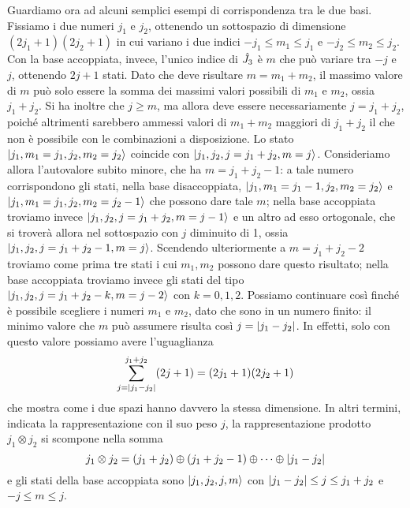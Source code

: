 Guardiamo ora ad alcuni semplici esempi di corrispondenza tra le due basi.
Fissiamo i due numeri $j_1$ e $j_2$, ottenendo un sottospazio di dimensione $(2j_1+1)(2j_2+1)$ in cui variano i due indici $-j_1\le m_1\le j_1$ e $-j_2\le m_2\le j_2$.
Con la base accoppiata, invece, l'unico indice di $\hat{J}_3$ è $m$ che può variare tra $-j$ e $j$, ottenendo $2j+1$ stati.
Dato che deve risultare $m=m_1+m_2$, il massimo valore di $m$ può solo essere la somma dei massimi valori possibili di $m_1$ e $m_2$, ossia $j_1+j_2$.
Si ha inoltre che $j\ge m$, ma allora deve essere necessariamente $j=j_1+j_2$, poich\'e altrimenti sarebbero ammessi valori di $m_1+m_2$ maggiori di $j_1+j_2$ il che non è possibile con le combinazioni a disposizione.
Lo stato $\lvert j_1,m_1=j_1,j_2,m_2=j_2\rangle$ coincide con $\lvert j_1,j_2,j=j_1+j_2,m=j\rangle$.
Consideriamo allora l'autovalore subito minore, che ha $m=j_1+j_2-1$: a tale numero corrispondono gli stati, nella base disaccoppiata, $\lvert j_1,m_1=j_1-1,j_2,m_2=j_2\rangle$ e $\lvert j_1,m_1=j_1,j_2,m_2=j_2-1\rangle$ che possono dare tale $m$; nella base accoppiata troviamo invece $\lvert j_1,j_2,j=j_1+j_2,m=j-1\rangle$ e un altro ad esso ortogonale, che si troverà allora nel sottospazio con $j$ diminuito di 1, ossia $\lvert j_1,j_2,j=j_1+j_2-1,m=j\rangle$.
Scendendo ulteriormente a $m=j_1+j_2-2$ troviamo come prima tre stati i cui $m_1,m_2$ possono dare questo risultato; nella base accoppiata troviamo invece gli stati del tipo $\lvert j_1,j_2,j=j_1+j_2-k,m=j-2\rangle$ con $k=0,1,2$.
Possiamo continuare cos\`i finch\'e è possibile scegliere i numeri $m_1$ e $m_2$, dato che sono in un numero finito: il minimo valore che $m$ può assumere risulta cos\`i $j=\lvert j_1-j_2\rvert$.
In effetti, solo con questo valore possiamo avere l'uguaglianza
\begin{equation}
	\sum_{j=\lvert j_1-j_2\rvert}^{j_1+j_2}(2j+1)=(2j_1+1)(2j_2+1)
\end{equation}
che mostra come i due spazi hanno davvero la stessa dimensione.
In altri termini, indicata la rappresentazione con il suo peso $j$, la rappresentazione prodotto $j_1\otimes j_2$ si scompone nella somma
\begin{equation}
	j_1\otimes j_2=(j_1+j_2)\oplus(j_1+j_2-1)\oplus\cdots\oplus\lvert j_1-j_2\rvert
\end{equation}
e gli stati della base accoppiata sono $\lvert j_1,j_2,j,m\rangle$ con $\lvert j_1-j_2\rvert\le j\le j_1+j_2$ e $-j\le m\le j$.
